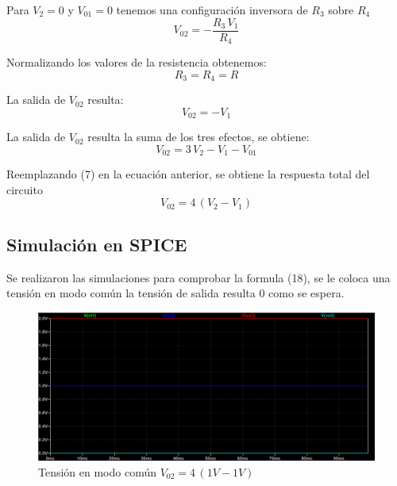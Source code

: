 \documentclass[12pt]{article}
\begin{document}
		Para $V_2=0$ y $V_{01}=0$  tenemos una configuración inversora de $R_3$ sobre $R_4$
		\begin{equation}
			V_{02}=-\frac{R_3 \,V_1 }{R_4 }
		\end{equation}
		
		Normalizando los valores de la resistencia obtenemos:
		\begin{equation}
			R_3=R_4=R 
		\end{equation}
		
		La salida de $V_{02}$ resulta:
		\begin{equation}
			V_{02}=-V_1
		\end{equation}
		
		La salida de $V_{02}$ resulta la suma de los tres efectos, se obtiene:
		\begin{equation}
			V_{02}=3\,V_2-V_1-V_{01}
		\end{equation}
		
		Reemplazando (7) en la ecuación anterior, se obtiene la respuesta total del circuito
		\begin{equation}
			V_{02}=4\,(V_2-V_1)
		\end{equation}
		
		\subsection{Simulación en SPICE}
		Se realizaron las simulaciones para comprobar la formula (18), se le coloca una tensión en modo común
		la tensión de salida resulta 0 como se espera.
		
		\begin{figure}[h]
			\centering
			\includegraphics[width=1\linewidth]{Simulaciones-Resultados/Circuito1_Vo1(Vc)-Vo2(Vc)}
			\caption{Tensión en modo común $V_{02}=4\,(1V-1V)$}
			\label{fig:circuito1vo1vc-vo2vc}
		\end{figure} 
		
\end{document}
